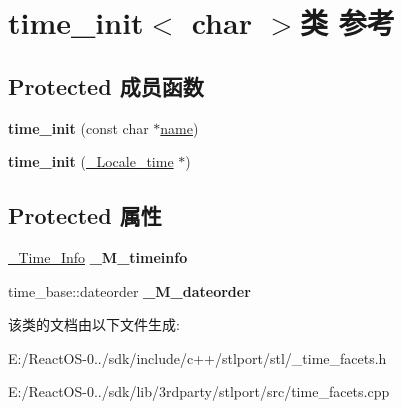 \hypertarget{classtime__init_3_01char_01_4}{}\section{time\+\_\+init$<$ char $>$类 参考}
\label{classtime__init_3_01char_01_4}
\subsection*{Protected 成员函数}
\begin{DoxyCompactItemize}
\item 
\mbox{\label{classtime__init_3_01char_01_4_aede4351fd0de45b8855d7cf3bafb7f4e}} 
{\bfseries time\+\_\+init} (const char $\ast$\hyperlink{structname}{name})
\item 
\mbox{\label{classtime__init_3_01char_01_4_ae5bad8b66c133a51c8054290b21eae2e}} 
{\bfseries time\+\_\+init} (\hyperlink{struct___locale__time}{\+\_\+\+Locale\+\_\+time} $\ast$)
\end{DoxyCompactItemize}
\subsection*{Protected 属性}
\begin{DoxyCompactItemize}
\item 
\mbox{\label{classtime__init_3_01char_01_4_a1db2e60e6703f7c967cfcb227132c46f}} 
\hyperlink{class___time___info}{\+\_\+\+Time\+\_\+\+Info} {\bfseries \+\_\+\+M\+\_\+timeinfo}
\item 
\mbox{\label{classtime__init_3_01char_01_4_a4eeef34cdf29734be18cb037414565cd}} 
time\+\_\+base\+::dateorder {\bfseries \+\_\+\+M\+\_\+dateorder}
\end{DoxyCompactItemize}


该类的文档由以下文件生成\+:\begin{DoxyCompactItemize}
\item 
E\+:/\+React\+O\+S-\/0../sdk/include/c++/stlport/stl/\+\_\+time\+\_\+facets.\+h\item 
E\+:/\+React\+O\+S-\/0../sdk/lib/3rdparty/stlport/src/time\+\_\+facets.\+cpp\end{DoxyCompactItemize}

